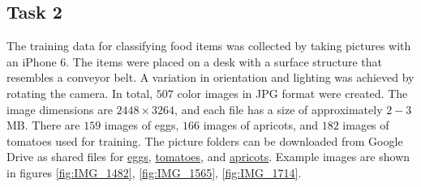 \documentclass[10pt, journal, compsoc]{IEEEtran}
\begin{document}
\subsection{Task 2}
The training data for classifying food items was collected by taking pictures with an iPhone 6. The items were placed on a desk with a surface structure that resembles a conveyor belt. A variation in orientation and lighting was achieved by rotating the camera. In total, $507$ color images in JPG format were created. The image dimensions are $2448 \times 3264$, and each file has a size of approximately $2 - 3$ MB. There are $159$ images of eggs, $166$ images of apricots, and $182$ images of tomatoes used for training. The picture folders can be downloaded from Google Drive as shared files for \href{https://drive.google.com/file/d/1HW1X9KxycGZRnXoJ5xLPJWkrDRKEih3V/view?usp=sharing}{eggs}, \href{https://drive.google.com/file/d/1ugdK5Q70PKQ7CYgqdEBu2u8pBz-67MMZ/view?usp=sharing}{tomatoes}, and \href{https://drive.google.com/file/d/14c-oQIlffO4MASaPsXZYFmt2CiP5Hi8y/view?usp=sharing}{apricots}. Example images are shown in figures \ref{fig:IMG_1482}, \ref{fig:IMG_1565}, \ref{fig:IMG_1714}.
\end{document}

